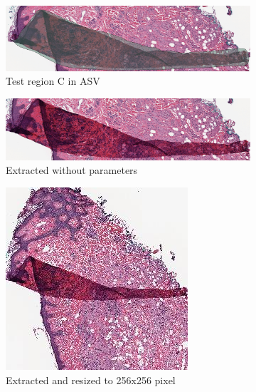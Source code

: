 \begin{figure}[H]
	\begin{subfigure}{1.\textwidth}
		\centering
		\includegraphics[width=1.\linewidth]{img/ts_test/region2.png}
		\caption{Test region C in ASV}
	\end{subfigure}
	\begin{subfigure}{1.\textwidth}
		\centering
		\includegraphics[width=1.\linewidth]{img/ts_test/2_orig.jpeg}
		\caption{Extracted without parameters}
		\label{subfig5:c1}
	\end{subfigure}
	\begin{subfigure}{.5\textwidth}
		\centering
		\includegraphics[width=.8\linewidth]{img/ts_test/2_r256.jpeg}
		\caption{Extracted and resized to 256x256 pixel}
		\label{subfig5:c2}
	\end{subfigure}
	\begin{subfigure}{.5\textwidth}

\end{subfigure}
\end{figure}
